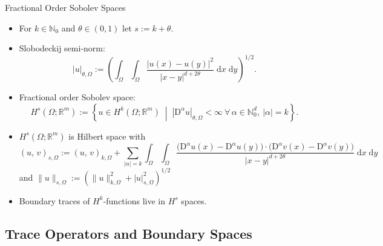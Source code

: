 \documentclass[10pt,aspectratio=169]{beamer}
\def\N{{\mathbb N}}
\def\R{{\mathbb R}}
\def\d{{\mathrm{d}}}
\def\dx{{\d x}}
\def\dy{{\d y}}
\def\Diff{{\mathrm{D}}}
\begin{document}
\begin{frame}{Fractional Order Sobolev Spaces}
	\begin{itemize}
		\item For $k\in\N_0$ and $\theta\in (0,1)$ let $s:= k+\theta$.
		\item Slobodeckij semi-norm:
		      \begin{equation*}
			      |u|_{\theta,\Omega}
			      :=
			      \left(\int_\Omega\int_\Omega \frac{|u(x)-u(y)|^2}{|x-y|^{d+2\theta}}\;\dx\;\dy\right)^{1/2}.
		      \end{equation*}

		\item Fractional order Sobolev space:
		      \begin{equation*}
			      H^s(\Omega;\R^m)
			      :=
			      \left\{
			      u\in H^k(\Omega;\R^m)\;\middle|\; |\Diff^\alpha u|_{\theta,\Omega}<\infty \ \forall\,\alpha\in\N_0^d,\ |\alpha|=k
			      \right\}.
		      \end{equation*}
		\item $H^s(\Omega;\R^m)$ is Hilbert space with
		      \begin{equation*}
			      (u,\,v)_{s,\Omega}
			      :=
			      (u,\,v)_{k,\Omega}
			      +
			      \sum_{|\alpha|=k}
			      \int_\Omega\int_\Omega
			      \frac{\big(\Diff^\alpha u(x)-\Diff^\alpha u(y)\big)\cdot\big(\Diff^\alpha v(x)-\Diff^\alpha v(y)\big)}
			      {|x-y|^{d+2\theta}}\;\dx\;\dy
		      \end{equation*}
		      and $\|u\|_{s,\Omega}
			      :=
			      \left(
			      \|u\|_{k,\Omega}^2 + |u|_{s,\Omega}^2
			      \right)^{1/2}$
		\item Boundary traces of $H^k$-functions live in $H^s$ spaces.
	\end{itemize}
\end{frame}

\subsection{Trace Operators and Boundary Spaces}
\end{document}
